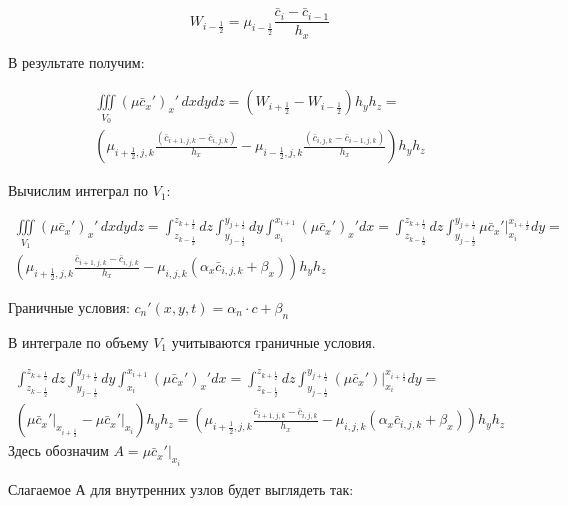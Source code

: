 \documentclass[12pt]{article}
\begin{document}
\begin{equation*}
	W_{i-\frac{1}{2}} = \mu_{i-\frac{1}{2}} \frac{\bar{c}_{i} -\bar{c}_{i-1} }{h_{x}}	
\end{equation*}

В результате получим:

\begin{multline*} 
	\iiint\limits_{V_0} (\mu\bar{c}_x')_x'\,dxdydz = (W_{i+\frac{1}{2}} - W_{i-\frac{1}{2}})h_yh_z=  \\   \left(\mu_{i+\frac{1}{2},j,k}\frac{(\bar{c}_{i+1,j,k}- \bar{c}_{i,j,k})}{h_x} - \mu_{i-\frac{1}{2},j,k}\frac{(\bar{c}_{i,j,k}- \bar{c}_{i-1,j,k})}{h_x}\right)h_yh_z
\end{multline*} 

Вычислим интеграл по $V_1$:

\begin{multline*} 
	\iiint\limits_{V_1} (\mu\bar{c}_x')_x'\,dxdydz = \int_{z_{k-\frac{1}{2}}}^{z_{k+\frac{1}{2}}}dz    
	\int_{y_{j-\frac{1}{2}}}^{y_{j+\frac{1}{2}}}dy  
	\int_{x_{i}}^{x_{i+1}}(\mu\bar{c}_x')_x'dx = 
	\int_{z_{k-\frac{1}{2}}}^{z_{k+\frac{1}{2}}}dz    
	\int_{y_{j-\frac{1}{2}}}^{y_{j+\frac{1}{2}}}\mu\bar{c}_x'
	\bigg|_{x_{i}}^{x_{i+\frac{1}{2}}}dy =  \\
	\left(\mu_{i+\frac{1}{2},j,k} \frac{\bar{c}_{i+1,j,k}- \bar{c}_{i,j,k}}{h_x} - 
	\mu_{i,j,k}(\alpha_x\bar{c}_{i,j,k}+\beta_x) \right)h_yh_z 	    
\end{multline*} 

Граничные условия:
$c_n'(x,y,t)=\alpha_n\cdot c+\beta_n$

В интеграле по объему $V_1$ учитываются граничные условия.

\begin{multline*} 
    \int_{z_{k-\frac{1}{2}}}^{z_{k+\frac{1}{2}}}dz    
	\int_{y_{j-\frac{1}{2}}}^{y_{j+\frac{1}{2}}}dy  
	\int_{x_{i}}^{x_{i+1}}(\mu\bar{c}_x')_x'dx = 
	\int_{z_{k-\frac{1}{2}}}^{z_{k+\frac{1}{2}}}dz    
	\int_{y_{j-\frac{1}{2}}}^{y_{j+\frac{1}{2}}}(\mu\bar{c}_x')
	\bigg|_{x_{i}}^{x_{i+\frac{1}{2}}}dy = 	\\
	\left(\mu\bar{c}_x'\bigg|_{x_{i+\frac{1}{2}}} - \mu\bar{c}_x'\bigg|_{x_i}    	\right)h_yh_z = \left(\mu_{i+\frac{1}{2},j,k} \frac{\bar{c}_{i+1,j,k}- \bar{c}_{i,j,k}}{h_x} - \mu_{i,j,k}(\alpha_x\bar{c}_{i,j,k} + \beta_x)  \right)h_yh_z
\end{multline*} 
Здесь  обозначим $A=\mu\bar{c}_x'\bigg|_{x_i}  $

Слагаемое А для внутренних узлов будет выглядеть так: 
\end{document}
